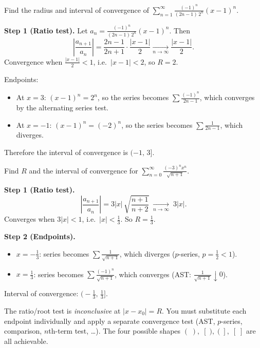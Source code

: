 \begin{examplebox}[title={Worked Example: finding $R$ and the interval (Lecture Ex.~6.3)}]
Find the radius and interval of convergence of $\displaystyle\sum_{n=1}^{\infty}\frac{(-1)^n}{(2n-1)\,2^n}(x-1)^n$.

\smallskip
\textbf{Step 1 (Ratio test).}
Let $a_n=\frac{(-1)^n}{(2n-1)\,2^n}(x-1)^n$. Then
\[
\left|\frac{a_{n+1}}{a_n}\right|
=\frac{2n-1}{2n+1}\cdot\frac{|x-1|}{2}
\xrightarrow[n\to\infty]{}\frac{|x-1|}{2}.
\]
Convergence when $\frac{|x-1|}{2}<1$, i.e.\ $|x-1|<2$, so $R=2$.

Endpoints:
\begin{itemize}[leftmargin=*]
\item At $x=3$: $(x-1)^n=2^n$, so the series becomes $\sum \frac{(-1)^n}{2n-1}$, which converges by the alternating series test.
\item At $x=-1$: $(x-1)^n=(-2)^n$, so the series becomes $\sum \frac{1}{2n-1}$, which diverges.
\end{itemize}
Therefore the interval of convergence is $(-1,\,3]$.
\end{examplebox}

\begin{examplebox}[title={Worked Example: endpoint behaviour (Lecture Ex.~6.4)}]
Find $R$ and the interval of convergence for $\displaystyle\sum_{n=0}^{\infty}\frac{(-3)^n x^n}{\sqrt{n+1}}$.

\smallskip
\textbf{Step 1 (Ratio test).}
\[
\left|\frac{a_{n+1}}{a_n}\right|
=3|x|\,\sqrt{\frac{n+1}{n+2}}
\;\xrightarrow[n\to\infty]{}\;3|x|.
\]
Converges when $3|x|<1$, i.e.\ $|x|<\tfrac13$. So $R=\tfrac13$.

\textbf{Step 2 (Endpoints).}
\begin{itemize}[leftmargin=*]
\item $x=-\tfrac13$: series becomes $\sum \frac{1}{\sqrt{n+1}}$, which diverges ($p$-series, $p=\tfrac12<1$).
\item $x=\tfrac13$: series becomes $\sum \frac{(-1)^n}{\sqrt{n+1}}$, which converges (AST: $\frac{1}{\sqrt{n+1}}\downarrow 0$).
\end{itemize}
Interval of convergence: $\bigl(-\tfrac13,\,\tfrac13\bigr]$.
\end{examplebox}

\begin{commonmistake}[title={Common Mistake: forgetting that endpoints can go either way}]
The ratio/root test is \emph{inconclusive} at $|x-x_0|=R$.
You must substitute each endpoint individually and apply a separate convergence test
(AST, $p$-series, comparison, $n$th-term test, \dots).
The four possible shapes $(\;),\;[\;),\;(\;],\;[\;]$ are all achievable.
\end{commonmistake}

